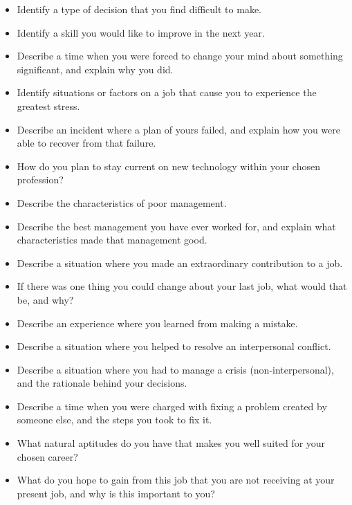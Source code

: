 \begin{itemize}
\item{} Identify a type of decision that you find difficult to make.
\item{} Identify a skill you would like to improve in the next year.
\item{} Describe a time when you were forced to change your mind about something significant, and explain why you did.
\item{} Identify situations or factors on a job that cause you to experience the greatest stress.
\item{} Describe an incident where a plan of yours failed, and explain how you were able to recover from that failure.
\item{} How do you plan to stay current on new technology within your chosen profession?
\item{} Describe the characteristics of poor management.
\item{} Describe the best management you have ever worked for, and explain what characteristics made that management good.
\item{} Describe a situation where you made an extraordinary contribution to a job.
\item{} If there was one thing you could change about your last job, what would that be, and why?
\item{} Describe an experience where you learned from making a mistake.
\item{} Describe a situation where you helped to resolve an interpersonal conflict.
\item{} Describe a situation where you had to manage a crisis (non-interpersonal), and the rationale behind your decisions.
\item{} Describe a time when you were charged with fixing a problem created by someone else, and the steps you took to fix it.
\item{} What natural aptitudes do you have that makes you well suited for your chosen career?
\item{} What do you hope to gain from this job that you are not receiving at your present job, and why is this important to you?
\end{itemize}




